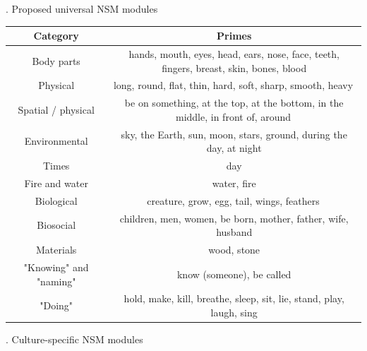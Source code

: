 . Proposed universal NSM modules

\begin{tabular}{|c|c|}
\hline
\textbf{Category}& 
\textbf{Primes}\\ 
\hline
Body parts& 
	

hands, mouth, eyes, head, ears, nose, face, teeth, fingers, breast, skin, bones, blood\\ 

Physical& 
	

long, round, flat, thin, hard, soft, sharp, smooth, heavy \\ 

Spatial / physical& 
	

be on something, at the top, at the bottom, in the middle, in front of, around \\ 

Environmental& 
	

sky, the Earth, sun, moon, stars, ground, during the day, at night\\ 

Times& 
	

day\\ 

Fire and water& 
	

water, fire\\ 

Biological& 
	

creature, grow, egg, tail, wings, feathers \\ 

Biosocial 
& 
	

children, men, women, be born, mother, father, wife, husband\\ 

Materials& 
	

wood, stone\\ 

"Knowing" and "naming"& 
	

know (someone), be called\\ 

"Doing"& 
	

hold, make, kill, breathe, sleep, sit, lie, stand, play, laugh, sing\\ 

\hline
\end{tabular}

. Culture-specific NSM modules

